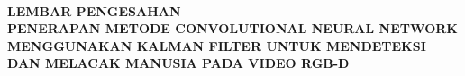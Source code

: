 \renewcommand{\headrulewidth}{3pt} 
\thispagestyle{fancy}

\hspace{-2cm}\\[1cm]
\begin{center}
{\bfseries LEMBAR PENGESAHAN}\\[1.0 cm]
{\bfseries PENERAPAN METODE CONVOLUTIONAL NEURAL NETWORK MENGGUNAKAN KALMAN FILTER UNTUK MENDETEKSI DAN MELACAK MANUSIA PADA VIDEO RGB-D} \\[0.5 cm]
\end{center}

\vspace{0.5cm}


